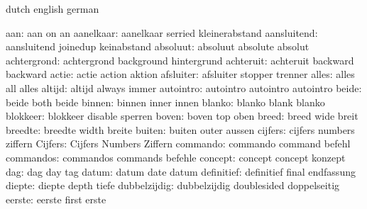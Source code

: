 \stopconstants




\startvariables       dutch                english             german

                aan:  aan                  on                  an
          aanelkaar:  aanelkaar            serried             kleinerabstand
        aansluitend:  aansluitend          joinedup            keinabstand
           absoluut:  absoluut             absolute            absolut
        achtergrond:  achtergrond          background          hintergrund
          achteruit:  achteruit            backward            backward %
              actie:  actie                action              aktion %
          afsluiter:  afsluiter            stopper             trenner
              alles:  alles                all                 alles
             altijd:  altijd               always              immer
          autointro:  autointro            autointro           autointro
              beide:  beide                both                beide
             binnen:  binnen               inner               innen
             blanko:  blanko               blank               blanko
           blokkeer:  blokkeer             disable             sperren
              boven:  boven                top                 oben
              breed:  breed                wide                breit
            breedte:  breedte              width               breite
             buiten:  buiten               outer               aussen
            cijfers:  cijfers              numbers             ziffern
            Cijfers:  Cijfers              Numbers             Ziffern
           commando:  commando             command             befehl
          commandos:  commandos            commands            befehle
            concept:  concept              concept             konzept
                dag:  dag                  day                 tag
              datum:  datum                date                datum
         definitief:  definitief           final               endfassung
             diepte:  diepte               depth               tiefe
       dubbelzijdig:  dubbelzijdig         doublesided         doppelseitig
             eerste:  eerste               first               erste
